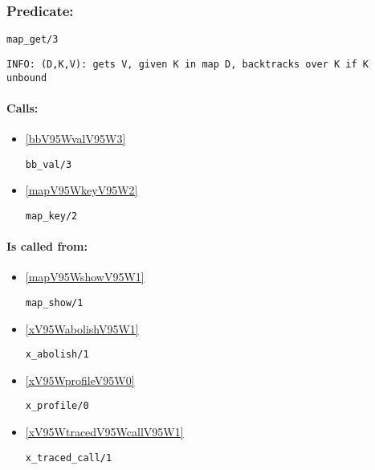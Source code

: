 \subsubsection{Predicate:} \label{mapV95WgetV95W3}

\begin{verbatim}
map_get/3
\end{verbatim}

{\small \begin{verbatim}
INFO: (D,K,V): gets V, given K in map D, backtracks over K if K unbound

\end{verbatim}}
\paragraph{Calls:} 
\begin{itemize}
\item \ref{bbV95WvalV95W3} 
\begin{verbatim}
bb_val/3
\end{verbatim}

\item \ref{mapV95WkeyV95W2} 
\begin{verbatim}
map_key/2
\end{verbatim}

\end{itemize}
\paragraph{Is called from:} 
\begin{itemize}
\item \ref{mapV95WshowV95W1} 
\begin{verbatim}
map_show/1
\end{verbatim}

\item \ref{xV95WabolishV95W1} 
\begin{verbatim}
x_abolish/1
\end{verbatim}

\item \ref{xV95WprofileV95W0} 
\begin{verbatim}
x_profile/0
\end{verbatim}

\item \ref{xV95WtracedV95WcallV95W1} 
\begin{verbatim}
x_traced_call/1
\end{verbatim}

\end{itemize}

